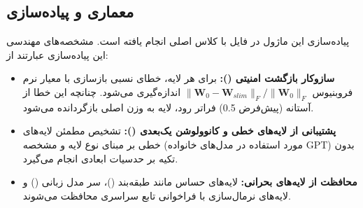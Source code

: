 \subsection{معماری و پیاده‌سازی}
پیاده‌سازی این ماژول در فایل  با کلاس اصلی  انجام یافته است. مشخصه‌های مهندسی این پیاده‌سازی عبارتند از:
\begin{itemize}
    \item \textbf{سازوکار بازگشت امنیتی ():} برای هر لایه، خطای نسبی بازسازی با معیار نرم فروبنیوس $\|\mathbf{W}_0 - \mathbf{W}_{slim}\|_F / \|\mathbf{W}_0\|_F$ اندازه‌گیری می‌شود. چنانچه این خطا از آستانه  (پیش‌فرض 0.5) فراتر رود، لایه به وزن اصلی بازگردانده می‌شود.
    \item \textbf{پشتیبانی از لایه‌های خطی و کانوولوشن یک‌بعدی ():} تشخیص مطمئن لایه‌های خطی بر مبنای نوع لایه و مشخصه  (مورد استفاده در مدل‌های خانواده GPT) بدون تکیه بر حدسیات ابعادی انجام می‌گیرد.
    \item \textbf{محافظت از لایه‌های بحرانی:} لایه‌های حساس مانند طبقه‌بند ()، سر مدل زبانی () و لایه‌های نرمال‌سازی با فراخوانی تابع سراسری  محافظت می‌شوند.
\end{itemize}
